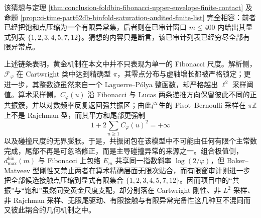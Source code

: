 

\noindent
该猜想与定理 \ref{thm:conclusion-foldbin-fibonacci-upper-envelope-finite-contact} 及命题 \ref{prop:xi-time-part62db-binfold-saturation-audited-finite-list} 完全相容：前者已经把饱和点压缩为一个有限异常集，后者则在已审计窗口 \(m\le 400\) 内给出其显式列表 \(\{1,2,3,4,5,7,12\}\)。猜想的内容只是断言，该已审计列表已经穷尽全部有限异常点。

\noindent
上述链条表明，黄金机制在本文中并不只表现为单一的 Fibonacci 尺度。解析侧，\(\mathcal F_\varphi\) 在 Cartwright 类中达到精确型 \(\pi\)，其零点分布与虚轴增长都被严格锁定；更进一步，其整数迹虽然来自一个 Laguerre--P\'olya 整函数，却严格越出 \(\ell^2\) 采样阈值。算术采样侧，\(C_\varphi(u)\) 沿 Fibonacci 与 Lucas 两条递推方向保留彼此不同的正共振簇，并以对数频率反复返回强共振区；由此产生的 Pisot--Bernoulli 采样在 \(\pi\mathbb Z\) 上不是 Rajchman 型，而其平方和尾部更强制
\[
1+2\sum_{u\ge 1}C_\varphi(u)^2=+\infty
\]
以及碰撞尺度的无界膨胀。于是，共振闭包在该模型中不可能由任何有限个主常数完成，尾部不再是可忽略修正，而是主导碰撞异常的来源之一。组合极值侧，\(d_{\max}^{\mathrm{bin}}(m)\) 与 Fibonacci 上包络 \(E_m\) 共享同一指数斜率 \(\log(2/\varphi)\)，但 Baker--Matveev 型刚性又禁止两者在算术精确层面无限次贴合，而有限窗审计则进一步把全部候选接触点压缩到显式有限集合 \(\{1,2,3,4,5,7,12\}\)。因而项目中的“共振”与“饱和”虽然同受黄金尺度支配，却分别落在 Cartwright 刚性、非 \(L^2\) 采样、非 Rajchman 采样、无限尾驱动、有限接触与有限异常完备性这几种互不混同而又彼此耦合的几何机制之中。

\endinput

